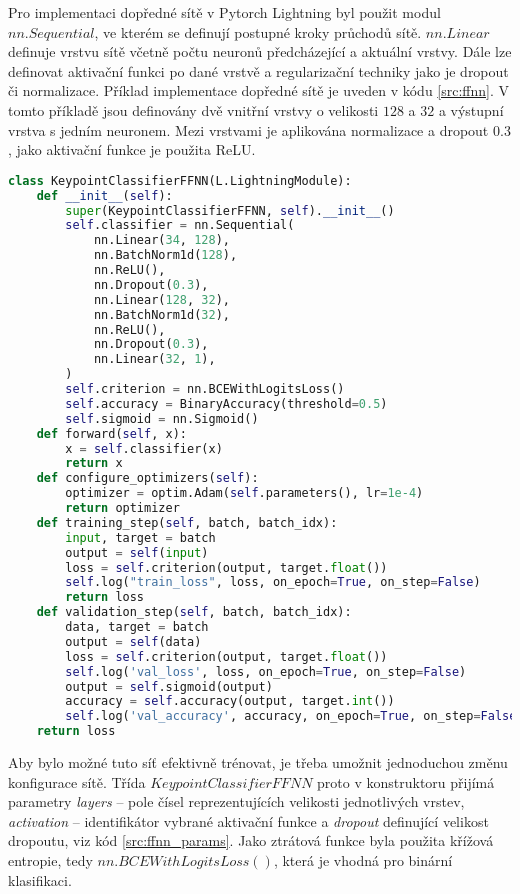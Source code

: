 Pro implementaci dopředné sítě v Pytorch Lightning byl použit modul
$nn.Sequential$, ve kterém se definují postupné kroky průchodů sítě.
$nn.Linear$ definuje vrstvu sítě včetně počtu neuronů předcházející a aktuální
vrstvy. Dále lze definovat aktivační funkci po dané vrstvě a regularizační
techniky jako je dropout či normalizace. Příklad implementace dopředné sítě je
uveden v kódu \ref{src:ffnn}. V tomto příkladě jsou definovány dvě vnitřní
vrstvy o velikosti $128$ a $32$ a výstupní vrstva s jedním neuronem. Mezi
vrstvami je aplikována normalizace a dropout $0.3$, jako aktivační funkce je
použita ReLU.

\begin{lstlisting}[language=Python, label=src:ffnn, caption={Ukázka implementace Dopředné sítě v PyTorch Lightning}]
class KeypointClassifierFFNN(L.LightningModule):
    def __init__(self):
        super(KeypointClassifierFFNN, self).__init__()
        self.classifier = nn.Sequential(
            nn.Linear(34, 128),
            nn.BatchNorm1d(128),
            nn.ReLU(),
            nn.Dropout(0.3),
            nn.Linear(128, 32),
            nn.BatchNorm1d(32),
            nn.ReLU(),
            nn.Dropout(0.3),
            nn.Linear(32, 1),
        )
        self.criterion = nn.BCEWithLogitsLoss()
        self.accuracy = BinaryAccuracy(threshold=0.5)
        self.sigmoid = nn.Sigmoid()    
    def forward(self, x):
        x = self.classifier(x)
        return x
    def configure_optimizers(self):
        optimizer = optim.Adam(self.parameters(), lr=1e-4)
        return optimizer
    def training_step(self, batch, batch_idx):
        input, target = batch
        output = self(input)
        loss = self.criterion(output, target.float())    
        self.log("train_loss", loss, on_epoch=True, on_step=False)
        return loss
    def validation_step(self, batch, batch_idx):
        data, target = batch
        output = self(data)
        loss = self.criterion(output, target.float())
        self.log('val_loss', loss, on_epoch=True, on_step=False)
        output = self.sigmoid(output)
        accuracy = self.accuracy(output, target.int())    
        self.log('val_accuracy', accuracy, on_epoch=True, on_step=False)
    return loss
\end{lstlisting}

Aby bylo možné tuto síť efektivně trénovat, je třeba umožnit jednoduchou změnu
konfigurace sítě. Třída $KeypointClassifierFFNN$ proto v konstruktoru přijímá
parametry \textit{layers} – pole čísel reprezentujících velikosti jednotlivých
vrstev, \textit{activation} – identifikátor vybrané aktivační funkce a
\textit{dropout} definující velikost dropoutu, viz kód \ref{src:ffnn_params}.
Jako ztrátová funkce byla použita křížová entropie, tedy
$nn.BCEWithLogitsLoss()$, která je vhodná pro binární klasifikaci.

